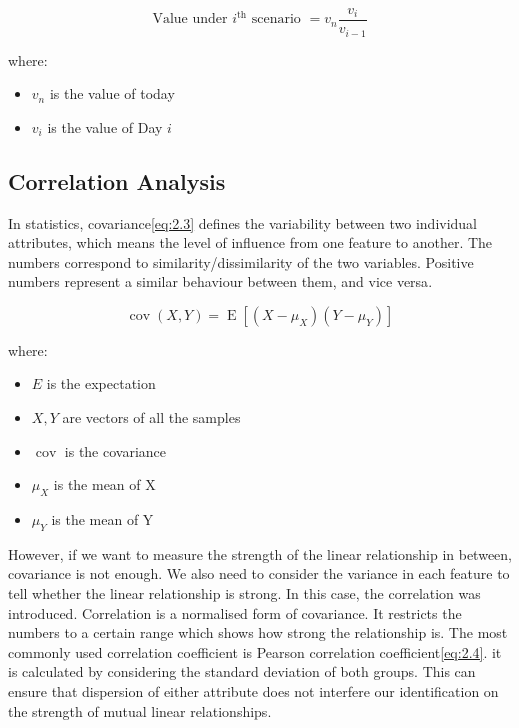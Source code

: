 \documentclass[11pt]{article} %
\theoremstyle{plain}
\theoremstyle{definition}
\begin{document}
{
  \begin{equation}
    \label{eq:2.2}
    \tag{2.2}
    {\text{Value under } i^{\mathrm{th}} \text{ scenario } = v_{n}\frac{v_{i}}{v_{i-1}}}
  \end{equation}

  \footnotesize
  where:
  \begin{itemize}[label=-, leftmargin=4em, itemsep=0.1em]
    \item $v_{n}$ is the value of today
    \item $v_{i}$ is the value of Day $i$
  \end{itemize}
}

\subsection{Correlation Analysis}

In statistics, covariance\eqref{eq:2.3} defines the variability between two individual attributes, which means the level of influence from one feature to another. The numbers correspond to similarity/dissimilarity of the two variables. Positive numbers represent a similar behaviour between them, and vice versa\cite{wiki/cov:2018}.

{
  \begin{equation}
    \label{eq:2.3}
    \tag{2.3}
    {\operatorname {cov} (X,Y)=\operatorname {E} [(X-\mu _{X})(Y-\mu _{Y})]}
  \end{equation}

  \footnotesize
  where:
  \begin{itemize}[label=-, leftmargin=4em, itemsep=0.1em]
    \item ${E}$ is the expectation
    \item ${X, Y}$ are vectors of all the samples
    \item $\operatorname {cov}$ is the covariance
    \item ${\mu}_{X}$ is the mean of X
    \item ${\mu}_{Y}$ is the mean of Y
  \end{itemize}
}

However, if we want to measure the strength of the linear relationship in between, covariance is not enough. We also need to consider the variance in each feature to tell whether the linear relationship is strong. In this case, the correlation was introduced. Correlation is a normalised form of covariance. It restricts the numbers to a certain range which shows how strong the relationship is. The most commonly used correlation coefficient is Pearson correlation coefficient\eqref{eq:2.4}. it is calculated by considering the standard deviation of both groups. This can ensure that dispersion of either attribute does not interfere our identification on the strength of mutual linear relationships\cite{ghall/pcc:2015}.
\end{document}
